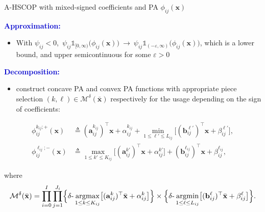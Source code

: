 \documentclass[aspectratio=169,xcolor=dvipsnames]{beamer}
\begin{document}
\begin{frame}{A-HSCOP with mixed-signed coefficients and PA $\phi_{ij}(\mathbf{x})$}
  \footnotesize
  \setlength{\abovedisplayskip}{3pt}
  \setlength{\belowdisplayskip}{3pt}

  \textcolor{MediumBlue}{\textbf{Approximation:}}
  \begin{itemize}
    \setlength{\itemsep}{0.02cm}
    \item With $\psi_{ij}<0$,\
      $\boxed{\psi_{ij}\mathds{1}_{[0,\infty)}\bigl(\phi_{ij}(\mathbf{x})\bigr)
        \ \rightarrow\ \psi_{ij}\mathds{1}_{(-\varepsilon,\infty)}
        \bigl(\phi_{ij}(\mathbf{x})\bigr)}$, which is a lower bound, and upper
      semicontinuous for some $\varepsilon>0$
  \end{itemize}

  \vspace{0.06cm}
  \textcolor{MediumBlue}{\textbf{Decomposition:}}
  \begin{itemize}
    \setlength{\itemsep}{0.02cm}
    \item construct concave PA and convex PA functions with appropriate piece
      selection $(k,\ell)\in\mathcal{M}^\delta(\bar{\mathbf{x}})$ respectively for
      the usage depending on the sign of coefficients:
  \end{itemize}
  \vspace{-0.08cm}
  \[
    \begin{aligned}
      \phi^{k_{ij};+}_{ij}(\mathbf{x}) &\triangleq
        (\mathbf{a}^{k_{ij}}_{ij})^\top\mathbf{x}+\alpha^{k_{ij}}_{ij}
        +\min_{1\leq\ell'\leq L_{ij}}
          \bigl[(\mathbf{b}^{\ell'}_{ij})^\top\mathbf{x}+\beta^{\ell'}_{ij}\bigr],\\
      \phi^{\ell_{ij};-}_{ij}(\mathbf{x}) &\triangleq
        \max_{1\leq k'\leq K_{ij}}
          \bigl[(\mathbf{a}^{k'}_{ij})^\top\mathbf{x}+\alpha^{k'}_{ij}\bigr]
        +(\mathbf{b}^{\ell_{ij}}_{ij})^\top\mathbf{x}+\beta^{\ell_{ij}}_{ij},
    \end{aligned}
  \]

  \vspace{0.02cm}
  where
  \[
    \resizebox{\linewidth}{!}{$\displaystyle
      \mathcal{M}^\delta(\bar{\mathbf{x}})=\prod_{i=0}^{I}\prod_{j=1}^{J_i}
      \Bigl\{\delta\text{-}\operatorname*{argmax}_{1\leq k\leq K_{ij}}
        \bigl[(\mathbf{a}^k_{ij})^\top\bar{\mathbf{x}}+\alpha^k_{ij}\bigr]\Bigr\}
      \times\Bigl\{\delta\text{-}\operatorname*{argmin}_{1\leq\ell\leq L_{ij}}
        \bigl[(\mathbf{b}^\ell_{ij})^\top\bar{\mathbf{x}}+\beta^\ell_{ij}\bigr]\Bigr\}.
    $}
  \]
\end{frame}
\end{document}
